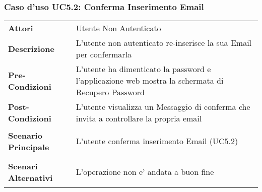 \subsubsection{Caso d'uso UC5.2:  Conferma Inserimento Email}
\label{UC5_2}

\begin{longtable}{ l | p{11cm}}
	\hline
	\rowcolor{Gray}
	 \multicolumn{2}{c}{UC5.2 - Conferma Inserimento Email} \\
	 \hline
	\textbf{Attori} & Utente Non Autenticato \\
	\textbf{Descrizione} & L'utente non autenticato re-inserisce la sua Email per confermarla \\
	\textbf{Pre-Condizioni} & L'utente ha dimenticato la password e l'applicazione web mostra la schermata di Recupero Password\\
	\textbf{Post-Condizioni} & L'utente visualizza un Messaggio di conferma che invita a controllare la propria email\\
	\textbf{Scenario Principale} & \begin{enumerate*}[label=(\arabic*.),itemjoin={\newline}]
		\item L'utente conferma inserimento Email (UC5.2)
	\end{enumerate*}\\
	\textbf{Scenari Alternativi} & 
	\begin{enumerate*}[label=(\arabic*.),itemjoin={\newline}]
		\item L'operazione non e' andata a buon fine
	\end{enumerate*}\\
\end{longtable}